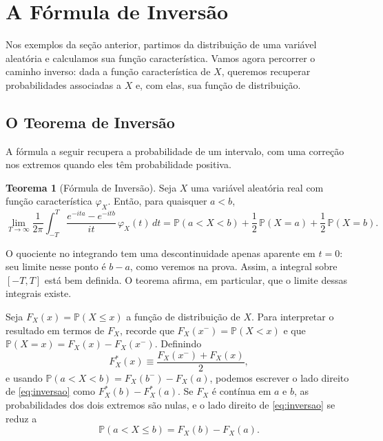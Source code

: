 \documentclass[12pt,portuguese]{article}
\theoremstyle{definition}
\newtheorem{theorem}{Teorema}
\theoremstyle{plainexercise}
\theoremstyle{starredexercise}
\theoremstyle{definition}
\begin{document}
\section{A Fórmula de Inversão}\label{sec:inversao}

Nos exemplos da seção anterior, partimos da distribuição de uma variável
aleatória e calculamos sua função característica. Vamos agora percorrer o
caminho inverso: dada a função característica de $X$, queremos recuperar
probabilidades associadas a $X$ e, com elas, sua função de distribuição.

\subsection{O Teorema de Inversão}\label{subsec:teorema-inversao}

A fórmula a seguir recupera a probabilidade de um intervalo, com uma correção
nos extremos quando eles têm probabilidade positiva.

\begin{theorem}[Fórmula de Inversão]\label{thm:inversao}
Seja $X$ uma variável aleatória real com função característica $\varphi_X$.
Então, para quaisquer $a<b$,
\begin{equation}\label{eq:inversao}
\lim_{T\to\infty}\frac{1}{2\pi}
\int_{-T}^{T}\frac{e^{-ita}-e^{-itb}}{it}\,\varphi_X(t)\,dt
=
\mathbb{P}(a<X<b)
+\frac12\,\mathbb{P}(X=a)
+\frac12\,\mathbb{P}(X=b).
\end{equation}
\end{theorem}

O quociente no integrando tem uma descontinuidade apenas aparente em $t=0$:
seu limite nesse ponto é $b-a$, como veremos na prova. Assim, a integral sobre
$[-T,T]$ está bem definida. O teorema afirma, em particular, que o limite
dessas integrais existe.


\medskip 

Seja $F_X(x)=\mathbb{P}(X\leqslant x)$ a função de distribuição de $X$.
Para interpretar o resultado em termos de $F_X$, recorde que
$F_X(x^-)=\mathbb{P}(X<x)$ e que
$\mathbb{P}(X=x)=F_X(x)-F_X(x^-)$. Definindo
\[
F_X^*(x)\equiv\frac{F_X(x^-)+F_X(x)}{2},
\]
e usando $\mathbb{P}(a<X<b)=F_X(b^-)-F_X(a)$, podemos escrever o lado direito
de \eqref{eq:inversao} como $F_X^*(b)-F_X^*(a)$. Se $F_X$ é contínua em $a$
e $b$, as probabilidades dos dois extremos são nulas, e o lado direito de 
\eqref{eq:inversao} se reduz a
\[
\mathbb{P}(a<X\leqslant b)=F_X(b)-F_X(a).
\]
\end{document}

